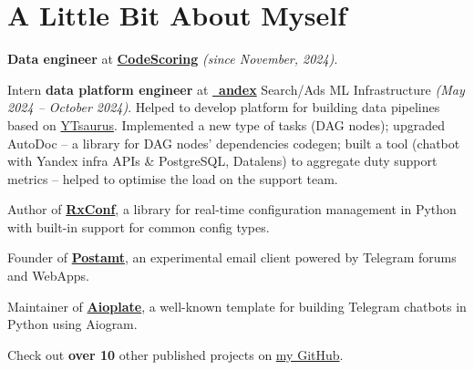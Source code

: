 \documentclass[a4paper,11pt]{article}
\newcommand{\MySkip}{
\vskip10pt
}
\begin{document}
\begin{adjustbox}{valign=t}
\begin{minipage}{0.65\textwidth}
\section*{A Little Bit About Myself}
\begin{flushleft}

\textbf{Data engineer} at \textbf{\href{https://codescoring.ru/}{CodeScoring}} \textit{(since November, 2024)}.

\MySkip

Intern \textbf{data platform engineer} at \href{https://ya.ru}{~\hspace{-0.40em}\textbf{andex}} Search/Ads ML Infrastructure \textit{(May 2024 -- October 2024)}. Helped to develop platform for building data pipelines based on \href{https://github.com/ytsaurus/ytsaurus}{YTsaurus}. Implemented a new type of tasks (DAG nodes); upgraded AutoDoc -- a library for DAG nodes' dependencies codegen; built a tool (chatbot with Yandex infra APIs \& PostgreSQL, Datalens) to aggregate duty support metrics -- helped to optimise the load on the support team.

\MySkip

Author of \href{https://realkarych.github.io/rxconf/}{\textbf{RxConf}}, a library for real-time configuration management in Python with built-in support for common config types.

\MySkip

Founder of \hspace{0.3em}\href{https://github.com/realkarych/postamt/}{ \hspace{-0.1em}\textbf{Postamt}}, an experimental email client powered by Telegram forums and WebApps.

\MySkip

Maintainer of \hspace{0.2em}\href{https://github.com/realkarych/aioplate/}{\faGithub\hspace{0.1em}\textbf{Aioplate}}, a well-known template for building Telegram chatbots in Python using Aiogram.

\MySkip

Check out \textbf{over 10} other published projects on \href{https://github.com/realkarych}{my GitHub}. \\
\end{flushleft}


\end{minipage}
\end{adjustbox}
\end{document}
